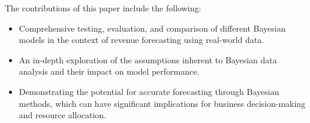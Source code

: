 The contributions of this paper include the following:
\begin{itemize}
  \item Comprehensive testing, evaluation, and comparison of different
    Bayesian models in the context of revenue forecasting using real-world
    data. 
  \item An in-depth exploration of the assumptions inherent to Bayesian data
    analysis and their impact on model performance. 
  \item Demonstrating the potential for accurate forecasting through
    Bayesian methods, which can have significant implications for business
    decision-making and resource allocation.
\end{itemize}
